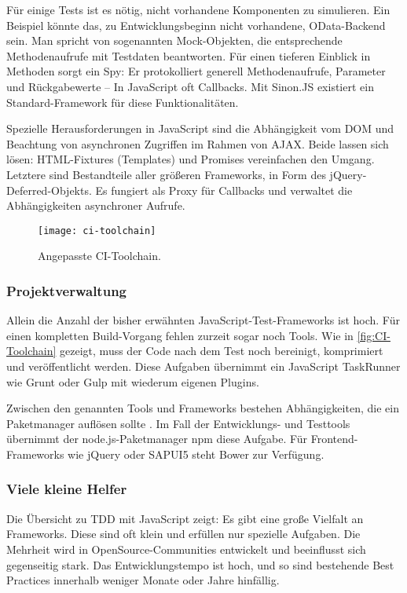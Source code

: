 Für einige Tests ist es nötig, nicht vorhandene Komponenten zu simulieren. Ein Beispiel könnte das, zu Entwicklungsbeginn nicht vorhandene, OData-Backend sein. Man spricht von sogenannten Mock-Objekten, die entsprechende Methodenaufrufe mit Testdaten beantworten. Für einen tieferen Einblick in Methoden sorgt ein Spy: Er protokolliert generell Methodenaufrufe, Parameter und Rückgabewerte -- In JavaScript oft Callbacks. Mit Sinon.JS existiert ein Standard-Framework für diese Funktionalitäten.

Spezielle Herausforderungen in JavaScript sind die Abhängigkeit vom \ac{DOM} und Beachtung von asynchronen Zugriffen im Rahmen von \ac{AJAX}. Beide lassen sich lösen: HTML-Fixtures (Templates) und Promises vereinfachen den Umgang. Letztere sind Bestandteile aller größeren Frameworks, \zB in Form des jQuery-Deferred-Objekts. Es fungiert als Proxy für Callbacks und verwaltet die Abhängigkeiten asynchroner Aufrufe.

\begin{figure}
	\centering
	\texttt{[image: ci-toolchain]}
	\caption[Angepasste CI-Toolchain]{Angepasste CI-Toolchain.}
	\label{fig:CI-Toolchain}
\end{figure}

\subsubsection{Projektverwaltung}
Allein die Anzahl der bisher erwähnten JavaScript-Test-Frameworks ist hoch. Für einen kompletten Build-Vorgang fehlen zurzeit sogar noch Tools. Wie in \autoref{fig:CI-Toolchain} gezeigt, muss der Code nach dem Test noch bereinigt, komprimiert und veröffentlicht werden. Diese Aufgaben übernimmt ein JavaScript TaskRunner wie Grunt oder Gulp mit wiederum eigenen Plugins.

Zwischen den genannten Tools und Frameworks bestehen Abhängigkeiten, die ein Paketmanager auflösen sollte \cite{Fain2014}. Im Fall der Entwicklungs- und Testtools übernimmt der node.js-Paketmanager npm diese Aufgabe. Für Frontend-Frameworks wie jQuery oder SAPUI5 steht Bower zur Verfügung.

\subsubsection{Viele kleine Helfer}
Die Übersicht zu \ac{TDD} mit JavaScript zeigt: Es gibt eine große Vielfalt an Frameworks. Diese sind oft klein und erfüllen nur spezielle Aufgaben. Die Mehrheit wird in OpenSource-Communities entwickelt und beeinflusst sich gegenseitig stark. Das Entwicklungstempo ist hoch, und so sind bestehende Best Practices innerhalb weniger Monate oder Jahre hinfällig.

